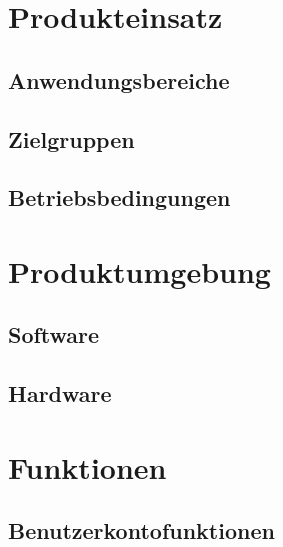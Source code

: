 \documentclass[parskip=full]{scrartcl}
\begin{document}
\section{Produkteinsatz}

\subsection{Anwendungsbereiche}
\subsection{Zielgruppen}

\subsection{Betriebsbedingungen}


\section{Produktumgebung}

\subsection{Software}
\subsection{Hardware}


\section{Funktionen}

\subsection{Benutzerkontofunktionen}
\end{document}
